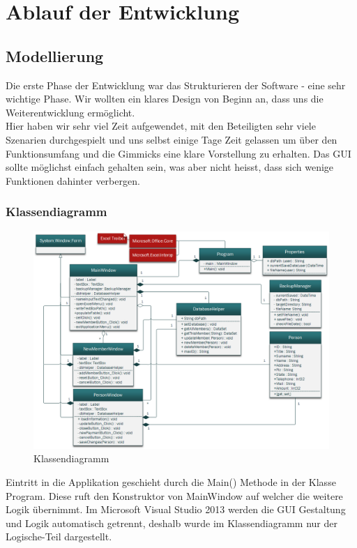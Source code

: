 \documentclass{article}
\begin{document}
\newpage


\section{Ablauf der Entwicklung}

\subsection{Modellierung}
Die erste Phase der Entwicklung war das Strukturieren der Software - eine sehr wichtige Phase. Wir wollten ein klares Design von Beginn an, dass uns die Weiterentwicklung ermöglicht.\\
Hier haben wir sehr viel Zeit aufgewendet, mit den Beteiligten sehr viele Szenarien durchgespielt und uns selbst einige Tage Zeit gelassen um über den Funktionsumfang und die Gimmicks eine klare Vorstellung zu erhalten. Das GUI sollte möglichst einfach gehalten sein, was aber nicht heisst, dass sich wenige Funktionen dahinter verbergen. 

\subsubsection{Klassendiagramm}
	
\begin{figure}[h]
	\centering
	\includegraphics[width=1 \textwidth]{KlassendiagrammBild}
	\caption{Klassendiagramm}
\end{figure}

Eintritt in die Applikation geschieht durch die Main() Methode in der Klasse Program. Diese ruft den Konstruktor von MainWindow auf welcher die weitere Logik übernimmt. Im Microsoft Visual Studio 2013 werden die GUI Gestaltung und Logik automatisch getrennt, deshalb wurde im Klassendiagramm nur der Logische-Teil dargestellt.
\end{document}
